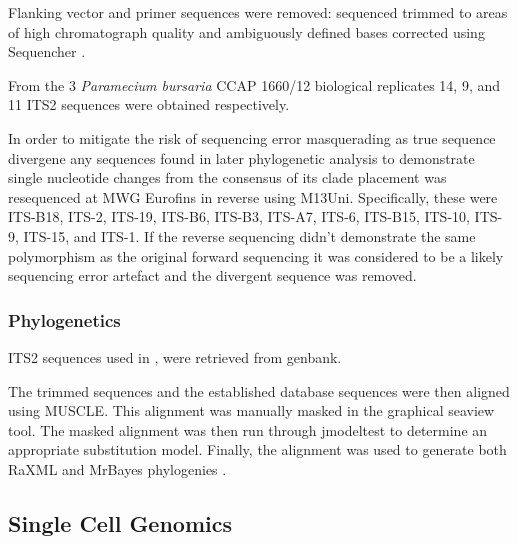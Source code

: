 Flanking vector and primer sequences were removed: sequenced trimmed to 
areas of high chromatograph quality and ambiguously defined bases corrected
using Sequencher \citep{Sequencher}.


From the 3 \textit{Paramecium bursaria} CCAP 1660/12 biological replicates
14, 9, and 11 ITS2 sequences were obtained respectively.





In order to mitigate the risk of sequencing error masquerading
as true sequence divergene any sequences found in later phylogenetic
analysis to demonstrate single nucleotide changes from the consensus
of its clade placement was resequenced at MWG Eurofins in reverse 
using M13Uni.  Specifically, these were ITS-B18,
ITS-2, ITS-19, ITS-B6, ITS-B3, ITS-A7, ITS-6, ITS-B15,
ITS-10, ITS-9, ITS-15, and ITS-1.
If the reverse sequencing didn't demonstrate the same polymorphism as
the original forward sequencing it was considered to be a likely 
sequencing error artefact and the divergent sequence was removed. 


%

\subsubsection{Phylogenetics}

ITS2 sequences used in \citep{Hoshina2010}, \citep{Hoshina2013} were retrieved
from genbank. 

The trimmed sequences and the established database sequences were then
aligned using MUSCLE. This alignment was manually masked in the graphical seaview
tool.  The masked alignment was then run through jmodeltest to 
determine an appropriate substitution model. 
Finally, the alignment was used to generate both RaXML and 
MrBayes phylogenies . 







\subsection{Single Cell Genomics}

